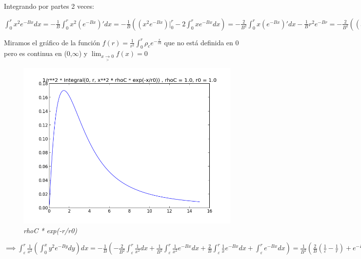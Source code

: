 \documentclass[12pt]{book}
\begin{document}
\begin{description}
\item Integrando por partes 2 veces:
\item $\int_0^r{x^2 e^{-Bx}dx} = - \frac{1}{B} \int_0^r{x^2 (e^{-Bx})\prime dx}
=-\frac{1}{B}( (x^2 e^{-Bx})\Big|_0^r  - 2\int_0^r{x e^{-Bx}dx})  = -\frac{2}{B^2}\int_0^r{x (e^{-Bx})\prime dx} - \frac{1}{B}r^2 e^{-Br} = -\frac{2}{B^2}((x e^{-Bx})\Big|_0^r - \int_0^r{e^{-Bx}dx}) - \frac{1}{B}r^2 e^{-Br} = -\frac{2}{B^3}e^{-Bx}\Big|_0^r -\frac{2}{B^2}r e^{-Br} - \frac{1}{B}r^2 e^{-Br} = \frac{2}{B^3} -\frac{2}{B^3}e^{-Br} -\frac{2}{B^2}r e^{-Br} - \frac{1}{B}r^2 e^{-Br}  $
\item Miramos el gráfico de la función $f(r) = \frac{1}{r^2}  \int_0^r{\rho_c  e^{-\frac{r}{r0}}}$
que no está definida en 0 pero es continua en (0,$\infty$) y $  \lim_{x \underset{>}{\to} 0} f(x) = 0$
\begin{figure}[!ht]
 \centering
 \includegraphics[scale=0.33]{func2Plot.png}
 \caption{\emph{rhoC * exp(-r/r0)}}
\end{figure}



\item $\implies \int_\varepsilon^r{ \frac{1}{x^2}(\int_0^x{y^2 e^{-By}dy})dx} = 
-\frac{1}{B}(-\frac{2}{B^2}\int_\varepsilon^r{\frac{1}{x^2}dx} +\frac{1}{B^2}\int_\varepsilon^r{\frac{1}{x^2}e^{-Bx}dx}  + \frac{2}{B}\int_\varepsilon^r{\frac{1}{x} e^{-Bx}dx} + \int_\varepsilon^r{e^{-Bx}dx} ) = 
\frac{1}{B^2}(\frac{2}{B}(\frac{1}{\varepsilon} - \frac{1}{r})  + e^{-Br} - \frac{1}{B}\int_\varepsilon^r{\frac{1}{x^2}e^{-Bx}dx} - 2\int_\varepsilon^r{\frac{1}{x} e^{-Bx}dx} ) $


\end{description}
\end{document}
